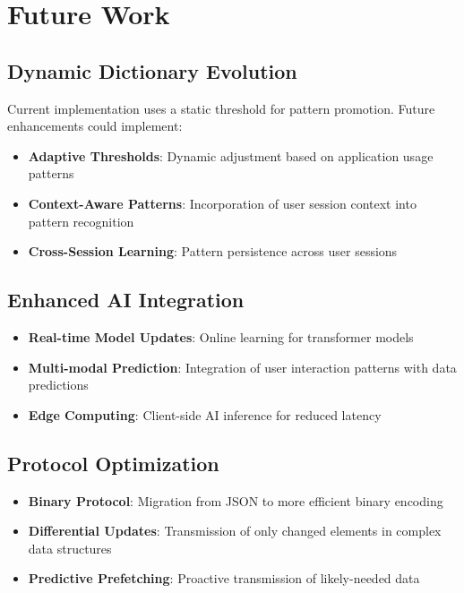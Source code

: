 \documentclass[12pt,a4paper]{article}
\begin{document}
\section{Future Work}

\subsection{Dynamic Dictionary Evolution}

Current implementation uses a static threshold for pattern promotion. Future enhancements could implement:

\begin{itemize}
    \item \textbf{Adaptive Thresholds}: Dynamic adjustment based on application usage patterns
    \item \textbf{Context-Aware Patterns}: Incorporation of user session context into pattern recognition
    \item \textbf{Cross-Session Learning}: Pattern persistence across user sessions
\end{itemize}

\subsection{Enhanced AI Integration}

\begin{itemize}
    \item \textbf{Real-time Model Updates}: Online learning for transformer models
    \item \textbf{Multi-modal Prediction}: Integration of user interaction patterns with data predictions
    \item \textbf{Edge Computing}: Client-side AI inference for reduced latency
\end{itemize}

\subsection{Protocol Optimization}

\begin{itemize}
    \item \textbf{Binary Protocol}: Migration from JSON to more efficient binary encoding
    \item \textbf{Differential Updates}: Transmission of only changed elements in complex data structures
    \item \textbf{Predictive Prefetching}: Proactive transmission of likely-needed data
\end{itemize}
\end{document}
